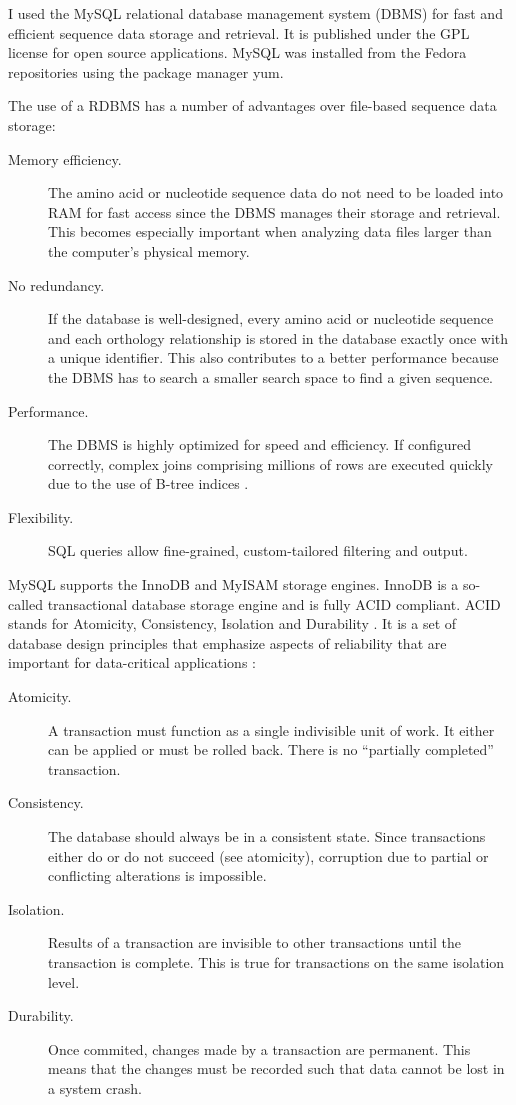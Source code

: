 I used the MySQL relational database management system (DBMS) 
for fast and efficient sequence data storage and retrieval. It is published
under the GPL license for open source applications. MySQL was installed from the
Fedora repositories using the package manager yum.

The use of a RDBMS has a number of advantages over file-based sequence
data storage:

\begin{description}
	\item[Memory efficiency.] The amino acid or nucleotide sequence data do not
		need to be loaded into RAM for fast access since the DBMS manages their
		storage and retrieval.  This becomes especially important when analyzing data
		files larger than the computer's physical memory.
	\item[No redundancy.] If the database is well-designed, every amino acid or
		nucleotide sequence and each orthology relationship is stored in the database
		exactly once with a unique identifier. This also contributes to a better
		performance because the DBMS has to search a smaller search space to find a
		given sequence.
	\item[Performance.] The DBMS is highly optimized for speed and efficiency. If
		configured correctly, complex joins comprising millions of rows are executed
		quickly due to the use of B-tree indices \citep{comer1979} .
	\item[Flexibility.] SQL queries allow fine-grained, custom-tailored filtering
		and output.
\end{description}

MySQL supports the InnoDB and MyISAM storage engines. InnoDB is a so-called
transactional database storage engine and is fully ACID compliant. ACID stands
for Atomicity, Consistency, Isolation and Durability \citep{haerder1983}. It
is a set of database design principles that emphasize aspects of reliability
that are important for data-critical applications \citep{schwartz2012}:

\begin{description}
	\item[Atomicity.] A transaction must function as a single indivisible unit of
		work. It either can be applied or must be rolled back. There is no
		``partially completed'' transaction.
	\item[Consistency.] The database should always be in a consistent state. Since
		transactions either do or do not succeed (see atomicity), corruption due to
		partial or conflicting alterations is impossible.
	\item[Isolation.] Results of a transaction are invisible to other
		transactions until the transaction is complete. This is true for
		transactions on the same isolation level.
	\item[Durability.] Once commited, changes made by a transaction are permanent.
		This means that the changes must be recorded such that data cannot be lost
		in a system crash. 
\end{description}

